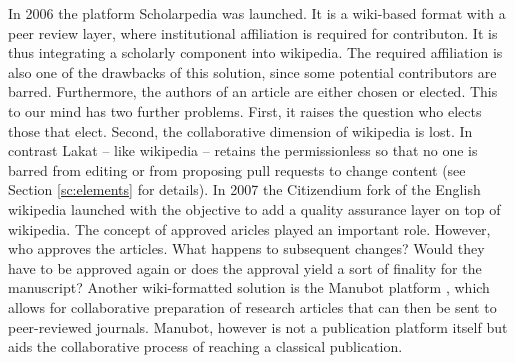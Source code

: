 In 2006 the platform Scholarpedia \cite{} was launched. It is a wiki-based format with a peer review layer, where institutional affiliation is required for contributon. It is thus integrating a scholarly component into wikipedia. The required affiliation is also one of the drawbacks of this solution, since some potential contributors are barred. Furthermore, the authors of an article are either chosen or elected. This to our mind has two further problems. First, it raises the question who elects those that elect. Second, the collaborative dimension of wikipedia is lost. In contrast Lakat -- like wikipedia -- retains the permissionless so that no one is barred from editing or from proposing pull requests to change content (see Section \ref{sc:elements} for details). In 2007 the Citizendium fork of the English wikipedia launched \cite{}  with the objective to add a quality assurance layer on top of wikipedia. The concept of approved aricles played an important role. However, who approves the articles. What happens to subsequent changes? Would they have to be approved again or does the approval yield a sort of finality for the manuscript?
Another wiki-formatted solution is the Manubot platform \cite{himmelstein2019open}, which allows for collaborative preparation of research articles that can then be sent to peer-reviewed journals. Manubot, however is not a publication platform itself but aids the collaborative process of reaching a classical publication. 


